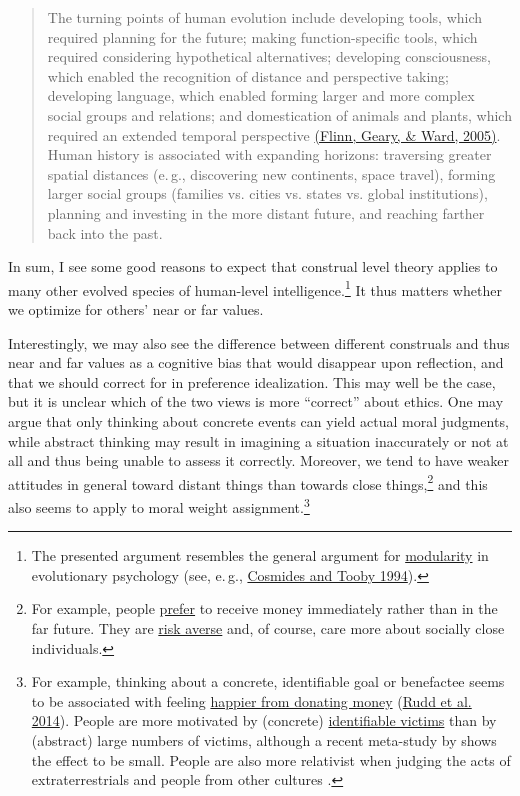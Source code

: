 \begin{quote}
The turning points of human evolution include developing tools, which
required planning for the future; making function-specific tools, which
required considering hypothetical alternatives; developing
consciousness, which enabled the recognition of distance and perspective
taking; developing language, which enabled forming larger and more
complex social groups and relations; and domestication of animals and
plants, which required an extended temporal perspective
\href{http://web.missouri.edu/~gearyd/Flinnetal2005.pdf}{(Flinn,
Geary, \& Ward, 2005)}. Human history is associated with expanding
horizons: traversing greater spatial distances (e.\,g., discovering new
continents, space travel), forming larger social groups (families vs.
cities vs. states vs. global institutions), planning and investing in
the more distant future, and reaching farther back into the past.
\end{quote}

In sum, I see some good reasons to expect that construal level theory
applies to many other evolved species of human-level
intelligence.\footnote{The presented argument resembles the general
  argument for
  \href{https://en.wikipedia.org/wiki/Modularity_of_mind}{modularity}
  in evolutionary psychology (see, e.\,g.,
  \href{http://citeseerx.ist.psu.edu/viewdoc/download?doi=10.1.1.140.7758\&rep=rep1\&type=pdf}{Cosmides
  and Tooby 1994}).} It thus matters whether we optimize for others'
near or far values.

Interestingly, we may also see the difference between different
construals and thus near and far values as a cognitive bias that would
disappear upon reflection, and that we should correct for in preference
idealization. This may well be the case, but it is unclear which of the
two views is more ``correct'' about ethics. One may argue that only
thinking about concrete events can yield actual moral judgments, while
abstract thinking may result in imagining a situation inaccurately or
not at all and thus being unable to assess it correctly. Moreover, we
tend to have weaker attitudes in general toward distant things than
towards close things,\footnote{For example, people
  \href{https://en.wikipedia.org/wiki/Time_preference}{prefer} to
  receive money immediately rather than in the far future. They are
  \href{https://en.wikipedia.org/wiki/Risk_aversion}{risk averse}
  and, of course, care more about socially close individuals.}
and this also seems to apply to moral weight assignment.\footnote{For
  example, thinking about a concrete, identifiable goal or benefactee
  seems to be associated with feeling
  \href{https://en.wikipedia.org/wiki/Warm-glow_giving}{happier
  from donating money}
  (\href{https://dash.harvard.edu/bitstream/handle/1/12534961/rudd,aaker,norton_getting-the-most-out-of-giving.pdf?sequence=3}{Rudd
  et al. 2014}). People are more motivated by (concrete)
  \href{https://en.wikipedia.org/wiki/Identifiable_victim_effect}{identifiable
  victims} than by (abstract) large numbers of victims, although a
  recent meta-study by \citet{Lee2016-lb} shows the
  effect to be small. People are
  also more relativist when judging the acts of extraterrestrials and
  people from other cultures \parencite{Sarkissian2011-be}.}

